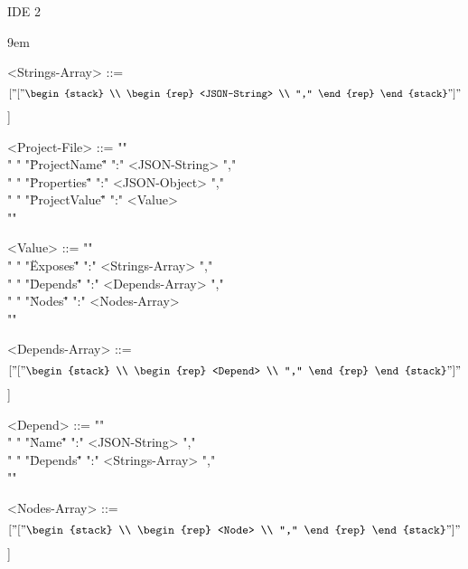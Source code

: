\newpage

{\huge IDE 2}


\grammarindent9em %
\begin{grammar}

<Strings-Array> ::= \[[
    "["
    \begin{stack}
      \\
      \begin{rep}
        <JSON-String> \\
        ","
      \end{rep}
    \end{stack}
    "]"
    \]]

<Project-File> ::= "{" \\
  "  " "\"ProjectName\"" ":" <JSON-String> "," \\
  "  " "\"Properties\"" ":" <JSON-Object> "," \\
  "  " "\"ProjectValue\"" ":" <Value> \\
  "}"

<Value> ::= "{" \\
  "  " "\"Exposes\"" ":" <Strings-Array> "," \\
  "  " "\"Depends\"" ":" <Depends-Array> "," \\
  "  " "\"Nodes\"" ":" <Nodes-Array> \\
  "}"

<Depends-Array> ::= \[[
    "["
    \begin{stack}
      \\
      \begin{rep}
        <Depend> \\
        ","
      \end{rep}
    \end{stack}
    "]"
    \]]

<Depend> ::= "{" \\
  "  " "\"Name\"" ":" <JSON-String> "," \\
  "  " "\"Depends\"" ":" <Strings-Array> "," \\
  "}"

<Nodes-Array> ::= \[[
    "["
    \begin{stack}
      \\
      \begin{rep}
        <Node> \\
        ","
      \end{rep}
    \end{stack}
    "]"
    \]]


\end{grammar}
